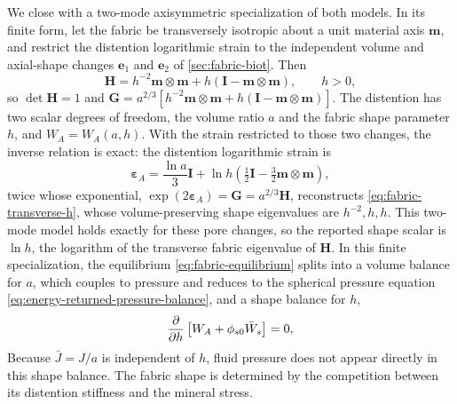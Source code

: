 We close with a two-mode axisymmetric specialization of both models. In its
finite form, let the fabric be transversely isotropic about a unit material axis
\(\mathbf m\), and restrict the distention logarithmic strain to the
independent volume and axial-shape changes \(\mathbf e_1\) and
\(\mathbf e_2\) of \cref{sec:fabric-biot}. Then
\begin{equation}
 \mathbf H=h^{-2}\mathbf m\otimes\mathbf m
   +h(\mathbf I-\mathbf m\otimes\mathbf m),\qquad h>0,
 \label{eq:fabric-transverse-h}
\end{equation}
so \(\det\mathbf H=1\) and
\(\mathbf G=a^{2/3}\left[h^{-2}\mathbf m\otimes\mathbf m
+h(\mathbf I-\mathbf m\otimes\mathbf m)\right]\). The distention has two
scalar degrees of freedom, the volume ratio \(a\) and the fabric shape
parameter \(h\), and \(W_A=W_A(a,h)\). With the
strain restricted to those two changes, the inverse relation is exact: the distention
logarithmic strain is
\begin{equation}
 \mathbf\varepsilon_A=\frac{\ln a}{3}\mathbf I
   +\ln h\left(\tfrac12\mathbf I-\tfrac32\mathbf m\otimes\mathbf m\right),
 \label{eq:fabric-transverse-strain}
\end{equation}
twice whose exponential, \(\exp(2\mathbf\varepsilon_A)=\mathbf G
=a^{2/3}\mathbf H\), reconstructs \eqref{eq:fabric-transverse-h},
whose volume-preserving shape eigenvalues are \(h^{-2},h,h\). This two-mode
model holds exactly for these pore changes, so the
reported shape scalar is \(\ln h\), the logarithm of the transverse
fabric eigenvalue of \(\mathbf H\).
In this finite specialization, the equilibrium
\eqref{eq:fabric-equilibrium} splits into a volume balance
for \(a\), which couples to pressure and reduces to the spherical pressure
equation \eqref{eq:energy-returned-pressure-balance}, and a shape balance
for \(h\),
\begin{equation}
 \frac{\partial }{\partial h}\left[W_A+\phi_{s0}\bar W_s\right]=0,
 \label{eq:fabric-shape-equilibrium}
\end{equation}
Because \(\bar J=J/a\) is independent of \(h\), fluid pressure does not
appear directly in this shape balance. The fabric shape is determined by the
competition between its distention stiffness and the mineral stress.

